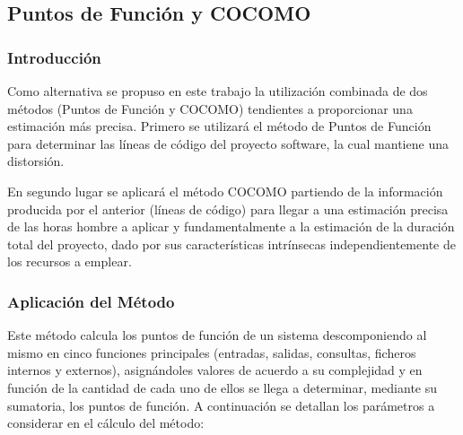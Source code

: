  \subsection{Puntos de Función y COCOMO}
 
      \subsubsection{Introducción}
      
      Como alternativa se propuso en este trabajo la utilización combinada de dos métodos
(Puntos de Función y COCOMO) tendientes a proporcionar una estimación más precisa.
Primero se utilizará el  método de Puntos de Función para determinar las líneas de código del proyecto software, la cual mantiene una distorsión.

En segundo lugar se aplicará el método COCOMO partiendo de la información producida por el anterior (líneas de código) para llegar a una estimación precisa de las horas hombre a aplicar y fundamentalmente a la estimación de la duración total del proyecto, dado por sus características intrínsecas independientemente de los recursos a emplear.

      \subsubsection{Aplicación del Método}
      
      Este método calcula los puntos de función de un sistema descomponiendo al mismo en cinco funciones principales (entradas, salidas, consultas, ficheros internos y externos), asignándoles valores de acuerdo a su complejidad y en función de la cantidad de cada uno de ellos se llega a determinar, mediante su sumatoria, los puntos de función.
A continuación se detallan los parámetros a considerar en el cálculo del método:

